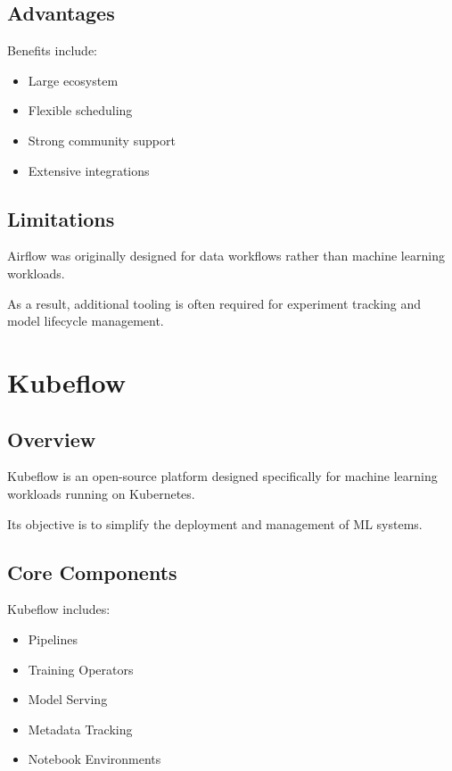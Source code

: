 \subsection{Advantages}

Benefits include:

\begin{itemize}
    \item Large ecosystem
    \item Flexible scheduling
    \item Strong community support
    \item Extensive integrations
\end{itemize}

\subsection{Limitations}

Airflow was originally designed for data workflows rather than machine learning workloads.

As a result, additional tooling is often required for experiment tracking and model lifecycle management.

\section{Kubeflow}

\subsection{Overview}

Kubeflow is an open-source platform designed specifically for machine learning workloads running on Kubernetes.

Its objective is to simplify the deployment and management of ML systems.

\subsection{Core Components}

Kubeflow includes:

\begin{itemize}
    \item Pipelines
    \item Training Operators
    \item Model Serving
    \item Metadata Tracking
    \item Notebook Environments
\end{itemize}

